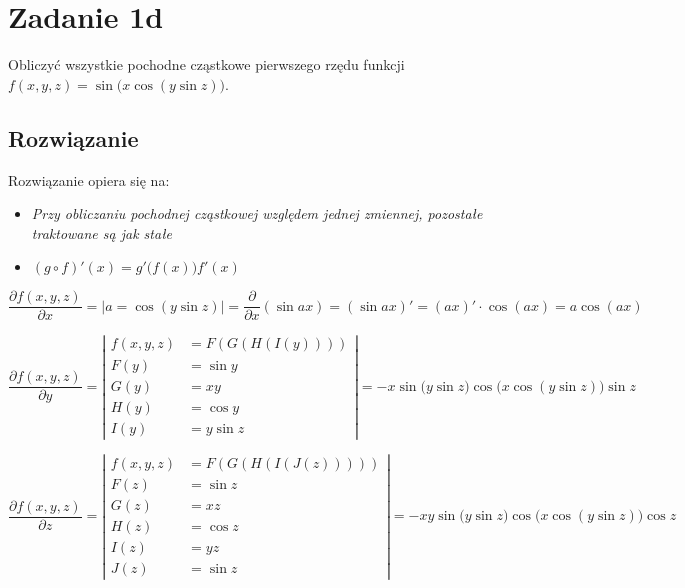 \documentclass{article}
\DeclareMathOperator{\?}{?}
\begin{document}
\section*{Zadanie 1d}
Obliczyć wszystkie pochodne cząstkowe pierwszego rzędu funkcji
$f(x,y,z) = \sin{\big(x \cos{(y \sin{z})}\big)}$.

\subsection*{Rozwiązanie}

Rozwiązanie opiera się na:
\begin{itemize}
   \item \textit{Przy obliczaniu pochodnej cząstkowej względem jednej zmiennej, pozostałe traktowane są jak stałe}
   \item $(g \circ f)'(x) = g'\Big(f(x)\Big) f'(x)$
\end{itemize}

\begin{equation*}
   \frac{\partial f(x,y,z)}{\partial x} = \Big| a = \cos{(y \sin{z})} \Big| =
   \frac{\partial}{\partial x}(\sin{ax}) = (\sin{ax})' = (ax)' \cdot \cos(ax) = a \cos(ax)
\end{equation*}

\begin{equation*}
   \frac{\partial f(x,y,z)}{\partial y} =
   \left| \begin{aligned}
      f(x,y,z) &= F(G(H(I(y)))) \\
      F(y)     &= \sin y \\
      G(y)     &= xy \\
      H(y)     &= \cos y \\
      I(y)     &= y \sin z
   \end{aligned} \right|
   = -x \sin{\big(y \sin z\big)} \cos{\big(x \cos{(y \sin z)} \big)} \sin{z}
\end{equation*}

\begin{equation*}
   \frac{\partial f(x,y,z)}{\partial z} =
   \left| \begin{aligned}
      f(x,y,z) &= F(G(H(I(J(z))))) \\
      F(z)     &= \sin z \\
      G(z)     &= xz \\
      H(z)     &= \cos z \\
      I(z)     &= yz \\
      J(z)     &= \sin z
   \end{aligned} \right|
   = -xy \sin{\big(y \sin z \big)} \cos{\big(x \cos{(y \sin z)} \big)} \cos{z}
\end{equation*}
\end{document}
